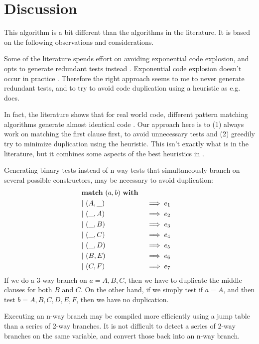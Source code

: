 \documentclass[a4paper, 11pt]{article}
\theoremstyle{definition}
\begin{document}
\section{Discussion}

This algorithm is a bit different than the algorithms in the literature. It is based on the following observations and considerations.

Some of the literature spends effort on avoiding exponential code explosion, and opts to generate redundant tests instead \cite{augustsson_compiling_1985}. Exponential code explosion doesn't occur in practice \cite{scott_when_2000}. Therefore the right approach seems to me to never generate redundant tests, and to try to avoid code duplication using a heuristic as e.g. \cite{maranget_compiling_2008} does.

In fact, the literature shows that for real world code, different pattern matching algorithms generate almost identical code \cite{scott_when_2000,maranget_compiling_2008}. Our approach here is to (1) always work on matching the first clause first, to avoid unnecessary tests and (2) greedily try to minimize duplication using the heuristic. This isn't exactly what is in the literature, but it combines some aspects of the best heuristics in \cite{maranget_compiling_2008}.

Generating binary tests instead of n-way tests that simultaneously branch on several possible constructors, may be necessary to avoid duplication:
\begin{alignat*}{4}
  &\mathbf{match}\ (a,b)\ \mathbf{with} \\
  &\mathbf{\mid}\ (A,\_)\quad &&\implies e_1 & \\
  &\mathbf{\mid}\ (\_,A)\quad &&\implies e_2 & \\
  &\mathbf{\mid}\ (\_,B)\quad &&\implies e_3 & \\
  &\mathbf{\mid}\ (\_,C)\quad &&\implies e_4 & \\
  &\mathbf{\mid}\ (\_,D)\quad &&\implies e_5 & \\
  &\mathbf{\mid}\ (B,E)\quad &&\implies e_6 & \\
  &\mathbf{\mid}\ (C,F)\quad &&\implies e_7 &
\end{alignat*}
If we do a 3-way branch on $a=A,B,C$, then we have to duplicate the middle clauses for both $B$ and $C$. On the other hand, if we simply test if $a=A$, and then test $b=A,B,C,D,E,F$, then we have no duplication.

Executing an n-way branch may be compiled more efficiently using a jump table than a series of 2-way branches. It is not difficult to detect a series of 2-way branches on the same variable, and convert those back into an n-way branch.
\end{document}
